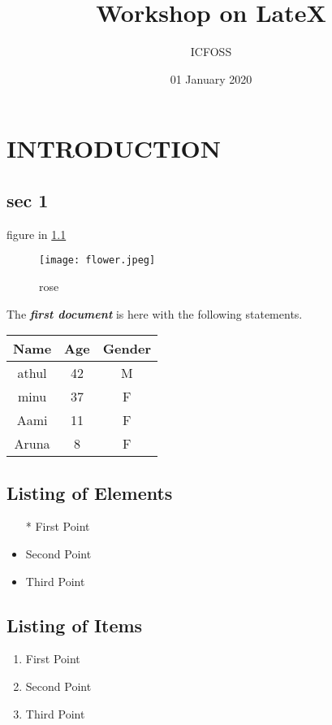 \documentclass[12pt]{report}
\begin{document}
\title{Workshop on LateX}
\author{ICFOSS}
\date{ 01 January 2020}
\maketitle
\chapter{ INTRODUCTION}
\section{sec 1}
figure in \ref{f:l1}

\begin{figure}[H]
\centering
\texttt{[image: flower.jpeg]}
\caption{rose}
\label{f:l1}

\end{figure}

The \textit{\textbf {first document }}is here with the following statements.
\begin{center}
\begin{tabular}{|c|c|c|}
\hline
\textbf {Name} & \textbf{Age} & \textbf{Gender}  \\
\hline
athul & 42 & M \\
minu & 37 & F \\
Aami & 11 & F\\
Aruna & 8 & F \\
\hline

\end{tabular}
\end{center}

\section{Listing of Elements}
\begin{itemize}
\item[*] First Point
\item Second Point
\item Third Point
\end{itemize}


\section{Listing of Items}
\begin{enumerate}[label=\alph*]
\item First Point
\item Second Point
\item Third Point
\end{enumerate}
\end{document}
